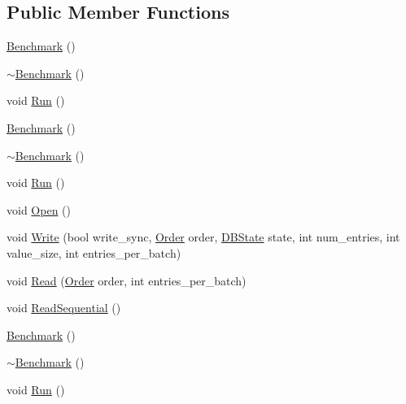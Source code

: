 \subsection*{Public Member Functions}
\begin{DoxyCompactItemize}
\item 
\hyperlink{classleveldb_1_1_benchmark_a05d001d05283f6d1d589d417b42aa736}{Benchmark} ()
\item 
\hyperlink{classleveldb_1_1_benchmark_a32bd4ebe6df5e4f664a944d71b066bd5}{$\sim$\+Benchmark} ()
\item 
void \hyperlink{classleveldb_1_1_benchmark_a2f262afa0c7d10fcf531fe9657fba490}{Run} ()
\item 
\hyperlink{classleveldb_1_1_benchmark_a05d001d05283f6d1d589d417b42aa736}{Benchmark} ()
\item 
\hyperlink{classleveldb_1_1_benchmark_a32bd4ebe6df5e4f664a944d71b066bd5}{$\sim$\+Benchmark} ()
\item 
void \hyperlink{classleveldb_1_1_benchmark_a2f262afa0c7d10fcf531fe9657fba490}{Run} ()
\item 
void \hyperlink{classleveldb_1_1_benchmark_a89a3b0da75e6cd2ffb879358e5dd82a6}{Open} ()
\item 
void \hyperlink{classleveldb_1_1_benchmark_a86876b2882d9015610330e69acfdff0d}{Write} (bool write\+\_\+sync, \hyperlink{classleveldb_1_1_benchmark_a4694fe0f2fd06d7da386305a339ddbc4}{Order} order, \hyperlink{classleveldb_1_1_benchmark_ad94bd817d74359a4d8cea6da609a28d4}{D\+B\+State} state, int num\+\_\+entries, int value\+\_\+size, int entries\+\_\+per\+\_\+batch)
\item 
void \hyperlink{classleveldb_1_1_benchmark_afc9cf258a63488924e172fadc67c12f1}{Read} (\hyperlink{classleveldb_1_1_benchmark_a4694fe0f2fd06d7da386305a339ddbc4}{Order} order, int entries\+\_\+per\+\_\+batch)
\item 
void \hyperlink{classleveldb_1_1_benchmark_a301897d0609459c5e6072db05da6b737}{Read\+Sequential} ()
\item 
\hyperlink{classleveldb_1_1_benchmark_a05d001d05283f6d1d589d417b42aa736}{Benchmark} ()
\item 
\hyperlink{classleveldb_1_1_benchmark_a32bd4ebe6df5e4f664a944d71b066bd5}{$\sim$\+Benchmark} ()
\item 
void \hyperlink{classleveldb_1_1_benchmark_a2f262afa0c7d10fcf531fe9657fba490}{Run} ()
\end{DoxyCompactItemize}
